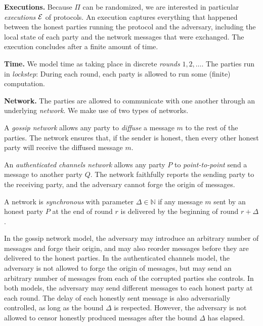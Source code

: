 \noindent
\textbf{Executions.}
Because $\Pi$ can be randomized, we are interested in particular
\emph{executions} $\mathcal{E}$ of protocols. An execution captures
everything that happened between the honest parties running the
protocol and the adversary, including the local state of each
party and the network messages that were exchanged. The execution
concludes after a finite amount of time.

\noindent
\textbf{Time.}
We model time as taking place in discrete \emph{rounds} $1, 2, \ldots$.
The parties run in \emph{lockstep}:
During each round, each party is allowed to run some (finite) computation.

\noindent
\textbf{Network.}
The parties are allowed to communicate with one another through an
underlying \emph{network}. We make use of two types of networks.

\begin{definition}
  A \emph{gossip network}
  allows any party to \emph{diffuse} a message $m$ to the rest of the parties.
  The network ensures that, if the sender is honest, then every other honest party
  will receive the diffused message $m$.
\end{definition}

\begin{definition}
  An \emph{authenticated channels network}
  allows any party $P$ to \emph{point-to-point} send a message to another
  party $Q$. The network faithfully reports the sending party to the receiving
  party, and the adversary cannot forge the origin of messages.
\end{definition}

\begin{definition}[Synchrony]
  A network is \emph{synchronous} with parameter $\Delta \in \mathbb{N}$ if
  any message $m$ sent by an honest party $P$
  at the end of round $r$ is delivered by the beginning of round $r + \Delta$.
\end{definition}

In the gossip network model, the adversary may introduce an arbitrary number of
messages and forge their origin, and may also reorder messages before they are
delivered to the honest parties. In the authenticated channels model, the adversary
is not allowed to forge the origin of messages, but may send an arbitrary number
of messages from each of the corrupted parties she controls.
In both models, the adversary may send different messages
to each honest party at each round. The delay of each honestly sent message is
also adversarially controlled, as long as the bound $\Delta$ is respected.
However, the adversary is not allowed to censor honestly produced messages
after the bound $\Delta$ has elapsed.

